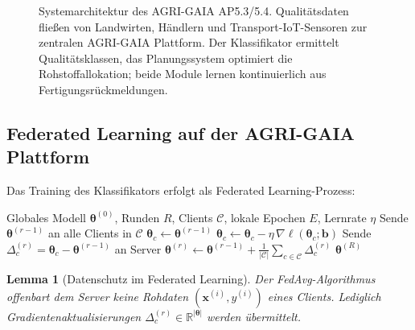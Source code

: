 \documentclass[a4paper, 12pt, twoside, openright]{report}
\newtheorem{lemma}[theorem]{Lemma}
\theoremstyle{definition}
\theoremstyle{definition}
\begin{document}
\begin{figure}[h]
	\caption{Systemarchitektur des AGRI-GAIA AP5.3/5.4. Qualitätsdaten fließen
		von Landwirten, Händlern und Transport-IoT-Sensoren zur zentralen
		AGRI-GAIA Plattform. Der Klassifikator ermittelt Qualitätsklassen,
		das Planungssystem optimiert die Rohstoffallokation; beide Module
		lernen kontinuierlich aus Fertigungsrückmeldungen.}
	\label{fig:architektur}
\end{figure}

\subsection{Federated Learning auf der AGRI-GAIA Plattform}

Das Training des Klassifikators erfolgt als Federated Learning-Prozess:

\begin{algorithm}[h]
	\caption{Federated Training des Kartoffel-Klassifikators (FedAvg)}
	\label{alg:fedavg}
	\begin{algorithmic}[1]
		\Require Globales Modell $\boldsymbol{\theta}^{(0)}$, Runden $R$,
		Clients $\mathcal{C}$, lokale Epochen $E$, Lernrate $\eta$
		\State Sende $\boldsymbol{\theta}^{(r-1)}$ an alle Clients in $\mathcal{C}$
		\State $\boldsymbol{\theta}_c \gets \boldsymbol{\theta}^{(r-1)}$
		\State $\boldsymbol{\theta}_c \gets \boldsymbol{\theta}_c -
		\eta\,\nabla\ell(\boldsymbol{\theta}_c; \mathbf{b})$
		\EndFor
		\EndFor
		\State Sende $\Delta_c^{(r)} = \boldsymbol{\theta}_c -
		\boldsymbol{\theta}^{(r-1)}$ an Server
		\EndFor
		\State $\boldsymbol{\theta}^{(r)} \gets \boldsymbol{\theta}^{(r-1)} +
		\frac{1}{|\mathcal{C}|} \sum_{c \in \mathcal{C}} \Delta_c^{(r)}$
		\EndFor
		\State \Return $\boldsymbol{\theta}^{(R)}$
	\end{algorithmic}
\end{algorithm}

\begin{lemma}[Datenschutz im Federated Learning]
	\label{lem:privacy}
	Der FedAvg-Algorithmus offenbart dem Server keine Rohdaten
	$(\mathbf{x}^{(i)}, y^{(i)})$ eines Clients. Lediglich Gradientenaktualisierungen
	$\Delta_c^{(r)} \in \mathbb{R}^{|\boldsymbol{\theta}|}$ werden übermittelt.
\end{lemma}
\end{document}
